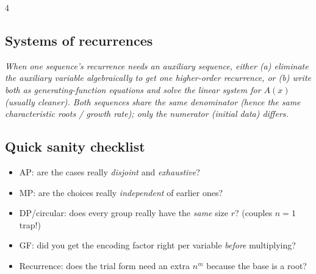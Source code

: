 \documentclass[8pt]{extarticle}
\newcommand{\note}[1]{{\footnotesize\color{gray!70!black}\emph{#1}}}
\begin{document}
\begin{multicols}{4}
\subsection*{Systems of recurrences}
\note{When one sequence's recurrence needs an auxiliary sequence, either (a) eliminate the auxiliary variable algebraically to get one higher-order recurrence, or (b) write both as generating-function equations and solve the linear system for $A(x)$ (usually cleaner). Both sequences share the same denominator (hence the same characteristic roots / growth rate); only the numerator (initial data) differs.}

\subsection*{Quick sanity checklist}
\begin{itemize}
\item AP: are the cases really \emph{disjoint} and \emph{exhaustive}?
\item MP: are the choices really \emph{independent} of earlier ones?
\item DP/circular: does every group really have the \emph{same} size $r$? (couples $n{=}1$ trap!)
\item GF: did you get the encoding factor right per variable \emph{before} multiplying?
\item Recurrence: does the trial form need an extra $n^m$ because the base is a root?
\end{itemize}

\end{multicols}
\end{document}
